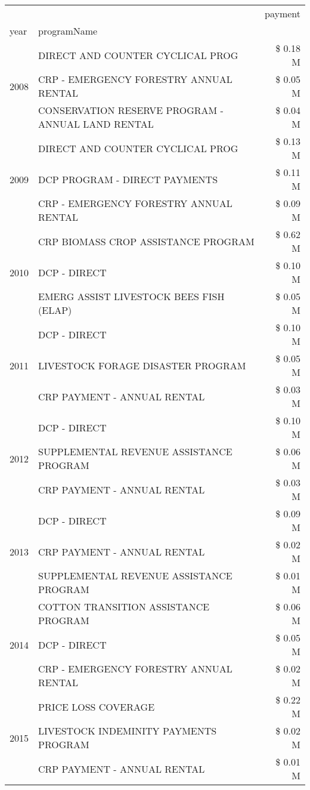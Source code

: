 \begin{tabular}{llr}
\toprule
 &  & payment \\
year & programName &  \\
\midrule
\multirow[t]{3}{*}{2008} & DIRECT AND COUNTER CYCLICAL PROG & \$ 0.18 M \\
 & CRP - EMERGENCY FORESTRY ANNUAL RENTAL & \$ 0.05 M \\
 & CONSERVATION RESERVE PROGRAM - ANNUAL LAND RENTAL & \$ 0.04 M \\
\cline{1-3}
\multirow[t]{3}{*}{2009} & DIRECT AND COUNTER CYCLICAL PROG & \$ 0.13 M \\
 & DCP PROGRAM - DIRECT PAYMENTS & \$ 0.11 M \\
 & CRP - EMERGENCY FORESTRY ANNUAL RENTAL & \$ 0.09 M \\
\cline{1-3}
\multirow[t]{3}{*}{2010} & CRP BIOMASS CROP ASSISTANCE PROGRAM & \$ 0.62 M \\
 & DCP - DIRECT & \$ 0.10 M \\
 & EMERG ASSIST LIVESTOCK BEES FISH (ELAP) & \$ 0.05 M \\
\cline{1-3}
\multirow[t]{3}{*}{2011} & DCP - DIRECT & \$ 0.10 M \\
 & LIVESTOCK FORAGE DISASTER PROGRAM & \$ 0.05 M \\
 & CRP PAYMENT - ANNUAL RENTAL & \$ 0.03 M \\
\cline{1-3}
\multirow[t]{3}{*}{2012} & DCP - DIRECT & \$ 0.10 M \\
 & SUPPLEMENTAL REVENUE ASSISTANCE PROGRAM & \$ 0.06 M \\
 & CRP PAYMENT - ANNUAL RENTAL & \$ 0.03 M \\
\cline{1-3}
\multirow[t]{3}{*}{2013} & DCP - DIRECT & \$ 0.09 M \\
 & CRP PAYMENT - ANNUAL RENTAL & \$ 0.02 M \\
 & SUPPLEMENTAL REVENUE ASSISTANCE PROGRAM & \$ 0.01 M \\
\cline{1-3}
\multirow[t]{3}{*}{2014} & COTTON TRANSITION ASSISTANCE PROGRAM & \$ 0.06 M \\
 & DCP - DIRECT & \$ 0.05 M \\
 & CRP - EMERGENCY FORESTRY ANNUAL RENTAL & \$ 0.02 M \\
\cline{1-3}
\multirow[t]{3}{*}{2015} & PRICE LOSS COVERAGE & \$ 0.22 M \\
 & LIVESTOCK INDEMINITY PAYMENTS PROGRAM & \$ 0.02 M \\
 & CRP PAYMENT - ANNUAL RENTAL & \$ 0.01 M \\
\cline{1-3}

\end{tabular}
